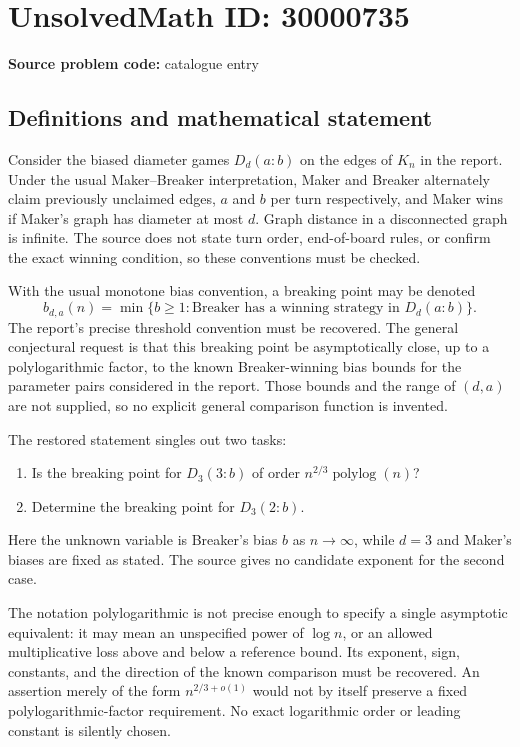 \documentclass[11pt]{article}
\begin{document}
\section*{UnsolvedMath ID: 30000735}
\textbf{Source problem code:} catalogue entry
\subsection{Definitions and mathematical statement}
Consider the biased diameter games $D_d(a:b)$ on the edges of $K_n$ in the report. Under the usual Maker--Breaker interpretation, Maker and Breaker alternately claim previously unclaimed edges, $a$ and $b$ per turn respectively, and Maker wins if Maker's graph has diameter at most $d$. Graph distance in a disconnected graph is infinite. The source does not state turn order, end-of-board rules, or confirm the exact winning condition, so these conventions must be checked.

With the usual monotone bias convention, a breaking point may be denoted
\[
 b_{d,a}(n)=\min\{b\ge1:\text{Breaker has a winning strategy in }D_d(a:b)\}.
\]
The report's precise threshold convention must be recovered. The general conjectural request is that this breaking point be asymptotically close, up to a polylogarithmic factor, to the known Breaker-winning bias bounds for the parameter pairs considered in the report. Those bounds and the range of $(d,a)$ are not supplied, so no explicit general comparison function is invented.

The restored statement singles out two tasks:
\begin{enumerate}
\item Is the breaking point for $D_3(3:b)$ of order $n^{2/3}\operatorname{polylog}(n)$?
\item Determine the breaking point for $D_3(2:b)$.
\end{enumerate}
Here the unknown variable is Breaker's bias $b$ as $n\to\infty$, while $d=3$ and Maker's biases are fixed as stated. The source gives no candidate exponent for the second case.

The notation polylogarithmic is not precise enough to specify a single asymptotic equivalent: it may mean an unspecified power of $\log n$, or an allowed multiplicative loss above and below a reference bound. Its exponent, sign, constants, and the direction of the known comparison must be recovered. An assertion merely of the form $n^{2/3+o(1)}$ would not by itself preserve a fixed polylogarithmic-factor requirement. No exact logarithmic order or leading constant is silently chosen.
\end{document}
